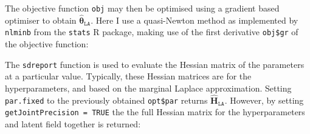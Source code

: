 \documentclass[a4paper, nobind]{templates/ociamthesis}
\newenvironment{Shaded}{\begin{snugshade}}{\end{snugshade}}
\newcommand{\AttributeTok}[1]{\textcolor[rgb]{0.13,0.29,0.53}{#1}}
\newcommand{\ConstantTok}[1]{\textcolor[rgb]{0.56,0.35,0.01}{#1}}
\newcommand{\DecValTok}[1]{\textcolor[rgb]{0.00,0.00,0.81}{#1}}
\newcommand{\FunctionTok}[1]{\textcolor[rgb]{0.13,0.29,0.53}{\textbf{#1}}}
\newcommand{\NormalTok}[1]{#1}
\newcommand{\OtherTok}[1]{\textcolor[rgb]{0.56,0.35,0.01}{#1}}
\newcommand{\SpecialCharTok}[1]{\textcolor[rgb]{0.81,0.36,0.00}{\textbf{#1}}}
\renewenvironment{Shaded}
{
  \vspace{10pt}%
  \begin{snugshade}%
}{%
  \end{snugshade}%
  \vspace{8pt}%
}
\begin{document}
The objective function \texttt{obj} may then be optimised using a gradient based optimiser to obtain \(\hat{\boldsymbol{\mathbf{\theta}}}_\texttt{LA}\).
Here I use a quasi-Newton method \autocite{dennis1981adaptive} as implemented by \texttt{nlminb} from the \texttt{stats} R package, making use of the first derivative \texttt{obj\$gr} of the objective function:

\begin{Shaded}
\end{Shaded}

The \texttt{sdreport} function is used to evaluate the Hessian matrix of the parameters at a particular value.
Typically, these Hessian matrices are for the hyperparameters, and based on the marginal Laplace approximation.
Setting \texttt{par.fixed} to the previously obtained \texttt{opt\$par} returns \(\hat{\boldsymbol{\mathbf{H}}}_\texttt{LA}\).
However, by setting \texttt{getJointPrecision\ =\ TRUE} the the full Hessian matrix for the hyperparameters and latent field together is returned:

\begin{Shaded}
\end{Shaded}
\end{document}
